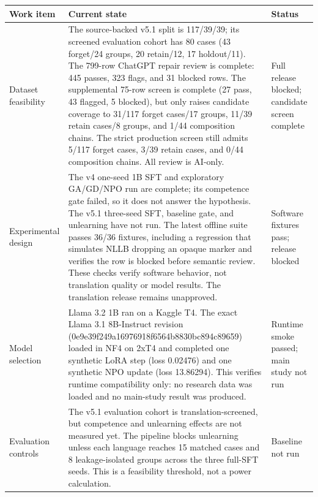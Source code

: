\documentclass[10pt,a4paper]{article}
\begin{document}
\begin{tabularx}{\textwidth}{
@{}p{3.3cm}X>{\raggedright\arraybackslash}p{2.5cm}@{}}
\toprule
\textbf{Work item} &
\textbf{Current state} &
\textbf{Status}\\
\midrule

Dataset feasibility &
The source-backed v5.1 split is 117/39/39; its screened evaluation cohort has 80 cases (43 forget/24 groups, 20 retain/12, 17 holdout/11). The 799-row ChatGPT repair review is complete: 445 passes, 323 flags, and 31 blocked rows. The supplemental 75-row screen is complete (27 pass, 43 flagged, 5 blocked), but only raises candidate coverage to 31/117 forget cases/17 groups, 11/39 retain cases/8 groups, and 1/44 composition chains. The strict production screen still admits 5/117 forget cases, 3/39 retain cases, and 0/44 composition chains. All review is AI-only. &
Full release blocked; candidate screen complete\\

Experimental design &
The v4 one-seed 1B SFT and exploratory GA/GD/NPO run are complete; its competence gate failed, so it does not answer the hypothesis. The v5.1 three-seed SFT, baseline gate, and unlearning have not run. The latest offline suite passes 36/36 fixtures, including a regression that simulates NLLB dropping an opaque marker and verifies the row is blocked before semantic review. These checks verify software behavior, not translation quality or model results. The translation release remains unapproved. &
Software fixtures pass; release blocked\\

Model selection &
Llama 3.2 1B ran on a Kaggle T4. The exact Llama 3.1 8B-Instruct revision (0e9e39f249a16976918f6564b8830bc894c89659) loaded in NF4 on 2xT4 and completed one synthetic LoRA step (loss 0.02476) and one synthetic NPO update (loss 13.86294). This verifies runtime compatibility only: no research data was loaded and no main-study result was produced. &
Runtime smoke passed; main study not run\\

Evaluation controls &
The v5.1 evaluation cohort is translation-screened, but competence and unlearning effects are not measured yet. The pipeline blocks unlearning unless each language reaches 15 matched cases and 8 leakage-isolated groups across the three full-SFT seeds. This is a feasibility threshold, not a power calculation. &
Baseline not run\\

\bottomrule
\end{tabularx}
\end{document}
